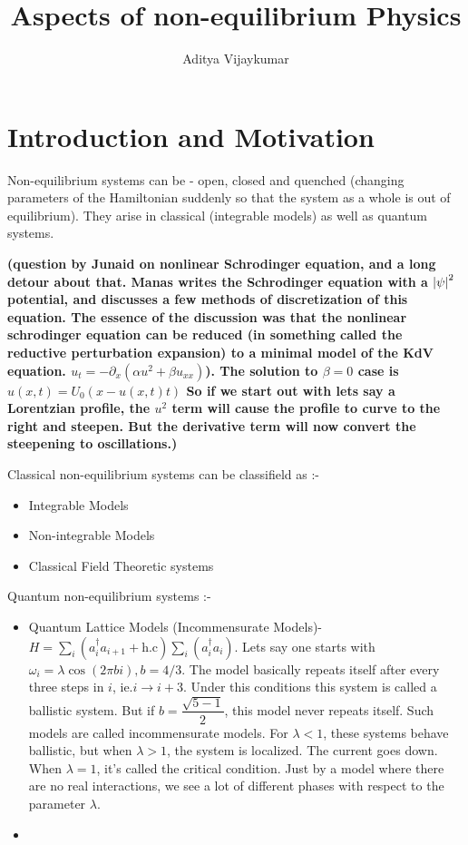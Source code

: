 \documentclass[a4paper,11pt]{article}
\title{\textbf{Aspects of non-equilibrium Physics}}
\author{Aditya Vijaykumar}
\affiliation{International Centre for Theoretical Sciences, Bengaluru, India.}
\begin{document}
\maketitle

\section{Introduction and Motivation}
Non-equilibrium systems can be - open, closed and quenched (changing parameters of the Hamiltonian suddenly so that the system as a whole is out of equilibrium). They arise in classical (integrable models) as well as quantum systems.

\textbf{(question by Junaid on nonlinear Schrodinger equation, and a long detour about that. Manas writes the Schrodinger equation with a $ \abs{\psi}^2 $ potential, and discusses a few methods of discretization of this equation. The essence of the discussion was that the nonlinear schrodinger equation can be reduced (in something called the reductive perturbation expansion) to a minimal model of the KdV equation. $ u_t = -\partial_x (\alpha u^2 + \beta u_{xx}) $). The solution to $ \beta=0 $ case is $ u(x,t) = U_0(x - u(x,t) t) $ So if we start out with lets say a Lorentzian profile, the $ u^2  $ term will cause the profile to curve to the right and steepen. But the derivative term will now convert the steepening to oscillations.) } 

Classical non-equilibrium systems can be classifield as :-
\begin{itemize}
	\item Integrable Models
	\item Non-integrable Models
	\item Classical Field Theoretic systems
\end{itemize}

Quantum non-equilibrium systems :-
\begin{itemize}
	\item Quantum Lattice Models (Incommensurate Models)- $ H = \sum_i (a_i^\dagger a_{i+1} + \text{h.c}) \sum_i (a_i^\dagger a_{i}) $. Lets say one starts with $ \omega_i = \lambda \cos(2 \pi b i), b = 4/3 $. The model basically repeats itself after every three steps in $ i $, ie.$ i \rightarrow i + 3 $. Under this conditions this system is called a ballistic system. But if $ b = \dfrac{\sqrt{5 -1}}{2} $, this model never repeats itself. Such models are called incommensurate models. For $ \lambda < 1 $, these systems behave ballistic, but when $ \lambda > 1 $, the system is localized. The current goes down. When $ \lambda = 1 $, it's called the critical condition. Just by a model where there are no real interactions, we see a lot of different phases with respect to the parameter $ \lambda $.
	\item 
\end{itemize}
\end{document}
